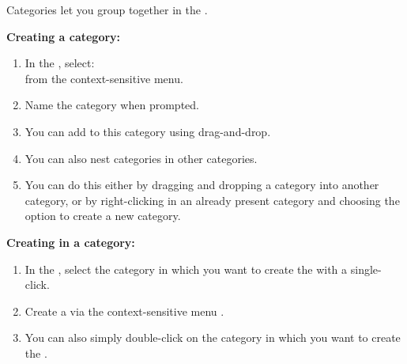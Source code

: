 % 
%
%
Categories let you  group \gdcases{} together in the \gdtestcasebrowser{}. 

\textbf{Creating a category:}
\begin{enumerate}
\item In the \gdtestcasebrowser{}, select:\\
 from the context-sensitive menu. 
\item Name the category when prompted.
\item You can add \gdcases{} to this category using drag-and-drop.  
\item You can also nest categories in other categories. 
\item You can do this either by dragging and dropping a category into another category, or by right-clicking in an already present category and choosing the option to create a new category. 
\end{enumerate}

\textbf{Creating \gdcases{} in a category:}
\begin{enumerate}
\item In the \gdtestcasebrowser{}, select the category in which you want to create the \gdcase{} with a single-click. 
\item Create a \gdcase{} via the context-sensitive menu .
\item You can also simply double-click on the category in which you want to create the \gdcase{}. 
\end{enumerate}


